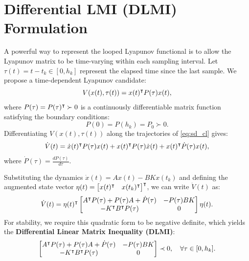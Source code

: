 \section{Differential LMI (DLMI) Formulation}
A powerful way to represent the looped Lyapunov functional is to allow the Lyapunov matrix to be time-varying within each sampling interval. Let $\tau(t) = t - t_k \in [0, h_k]$ represent the elapsed time since the last sample. We propose a time-dependent Lyapunov candidate:
\begin{equation}
V(x(t), \tau(t)) = x(t)^\intercal P(\tau) x(t) ,
\end{equation}
where $P(\tau) = P(\tau)^\intercal \succ 0$ is a continuously differentiable matrix function satisfying the boundary conditions:
\begin{equation}
P(0) = P(h_k) = P_0 \succ 0 .
\end{equation}
Differentiating $V(x(t), \tau(t))$ along the trajectories of \eqref{eq:sd_cl} gives:
\begin{equation}
\dot{V}(t) = \dot{x}(t)^\intercal P(\tau) x(t) + x(t)^\intercal P(\tau) \dot{x}(t) + x(t)^\intercal \dot{P}(\tau) x(t) ,
\end{equation}
where $\dot{P}(\tau) = \frac{dP(\tau)}{d\tau}$.

Substituting the dynamics $\dot{x}(t) = A x(t) - B K x(t_k)$ and defining the augmented state vector $\eta(t) = \begin{bmatrix} x(t)^\intercal & x(t_k)^\intercal \end{bmatrix}^\intercal$, we can write $\dot{V}(t)$ as:
\begin{equation}
\dot{V}(t) = \eta(t)^\intercal \begin{bmatrix} A^\intercal P(\tau) + P(\tau) A + \dot{P}(\tau) & -P(\tau) B K \\ -K^\intercal B^\intercal P(\tau) & 0 \end{bmatrix} \eta(t) .
\end{equation}
For stability, we require this quadratic form to be negative definite, which yields the \textbf{Differential Linear Matrix Inequality (DLMI)}:
\begin{equation}
    \begin{bmatrix} A^\intercal P(\tau) + P(\tau) A + \dot{P}(\tau) & -P(\tau) B K \\ -K^\intercal B^\intercal P(\tau) & 0 \end{bmatrix} \prec 0, \quad \forall \tau \in [0, h_k] . \label{eq:sd_dlmi}
\end{equation}

